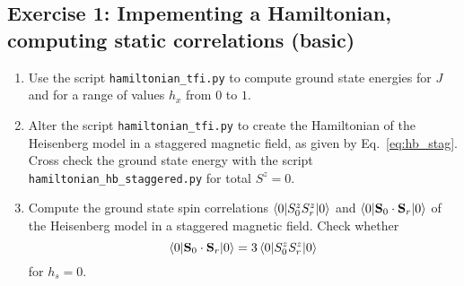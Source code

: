 \documentclass[]{article}
\theoremstyle{definition}
\begin{document}
\subsection*{Exercise 1: Impementing a Hamiltonian, computing static
  correlations (basic)}
\begin{enumerate}
\item Use the script \texttt{hamiltonian\_tfi.py} to compute ground
  state energies for $J$ and for a range of values $h_x$ from $0$ to
  $1$.
\item Alter the script \texttt{hamiltonian\_tfi.py} to create the
  Hamiltonian of the Heisenberg model in a staggered magnetic field,
  as given by Eq.~\ref{eq:hb_stag}. Cross check the ground state
  energy with the script \texttt{hamiltonian\_hb\_staggered.py} for
  total $S^z=0$.
\item Compute the ground state spin correlations
  $\braket{0|S^z_0S^z_r|0}$ and
  $\braket{0|\mathbf{S}_0\cdot\mathbf{S}_r|0}$ of the Heisenberg model
  in a staggered magnetic field. Check whether
  $$\braket{0|\mathbf{S}_0\cdot\mathbf{S}_r|0} = 3\braket{0|S^z_0S^z_r|0}$$
  for $h_s=0$.
\end{enumerate}
\end{document}
